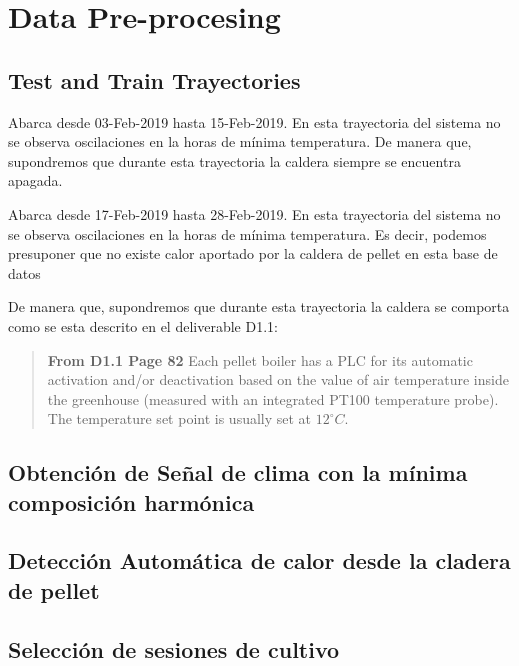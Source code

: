 
    \chapter{Data Pre-procesing }

    \section{Test and Train Trayectories }


\begin{dataset}\label{dataset:noheater}
   Abarca desde 03-Feb-2019 hasta 15-Feb-2019. En esta trayectoria del sistema no se observa oscilaciones en la horas de mínima temperatura. De manera que, supondremos que durante esta trayectoria la caldera siempre se encuentra apagada.
\end{dataset}

\begin{dataset}[Heater]\label{dataset:heater}
    Abarca desde 17-Feb-2019 hasta 28-Feb-2019. En esta trayectoria del sistema no se observa oscilaciones en la horas de mínima temperatura. Es decir, podemos presuponer que no existe calor aportado por la caldera de pellet en esta base de datos
\end{dataset}

De manera que, supondremos que durante esta trayectoria la caldera se comporta como se esta descrito en el deliverable D1.1:
\begin{verse}\textbf{From D1.1 Page 82} 
    Each pellet boiler has a PLC for its automatic activation and/or deactivation based on the value of air temperature inside the greenhouse (measured with an integrated PT100 temperature probe). The temperature set point is usually set at $12 ^\circ C$.
\end{verse}

\section{Obtención de Señal de clima con la mínima composición harmónica}


\section{Detección Automática de calor desde la cladera de pellet}

\section{Selección de sesiones de cultivo}
